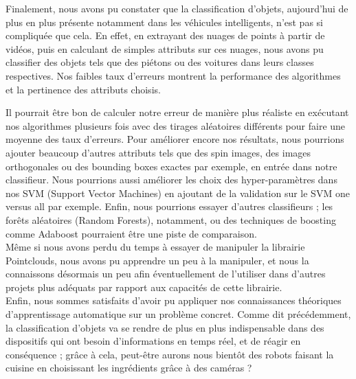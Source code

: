 Finalement, nous avons pu constater que la classification d'objets, aujourd'hui de plus en plus présente notamment dans les véhicules intelligents, n'est pas si compliquée que cela. En effet, en extrayant des nuages de points à partir de vidéos, puis en calculant de simples attributs sur ces nuages, nous avons pu classifier des objets tels que des piétons ou des voitures dans leurs classes respectives. Nos faibles taux d'erreurs montrent la performance des algorithmes et la pertinence des attributs choisis. 

Il pourrait être bon de calculer notre erreur de manière plus réaliste en exécutant nos algorithmes plusieurs fois avec des tirages aléatoires différents pour faire une moyenne des taux d'erreurs. Pour améliorer encore nos résultats, nous pourrions ajouter beaucoup d'autres attributs tels que des spin images, des images orthogonales ou des bounding boxes exactes par exemple, en entrée dans notre classifieur. Nous pourrions aussi améliorer les choix des hyper-paramètres dans nos SVM (Support Vector Machines) en ajoutant de la validation sur le SVM one versus all par exemple. Enfin, nous pourrions essayer d'autres classifieurs ; les forêts aléatoires (Random Forests), notamment, ou des techniques de boosting comme Adaboost pourraient être une piste de comparaison.\\

Même si nous avons perdu du temps à essayer de manipuler la librairie Pointclouds, nous avons pu apprendre un peu à la manipuler, et nous la connaissons désormais un peu afin éventuellement de l'utiliser dans d'autres projets plus adéquats par rapport aux capacités de cette librairie.\\

Enfin, nous sommes satisfaits d'avoir pu appliquer nos connaissances théoriques d'apprentissage automatique sur un problème concret. Comme dit précédemment, la classification d'objets va se rendre de plus en plus indispensable dans des dispositifs qui ont besoin d'informations en temps réel, et de réagir en conséquence ; grâce à cela, peut-être aurons nous bientôt des robots faisant la cuisine en choisissant les ingrédients grâce à des caméras ?\\